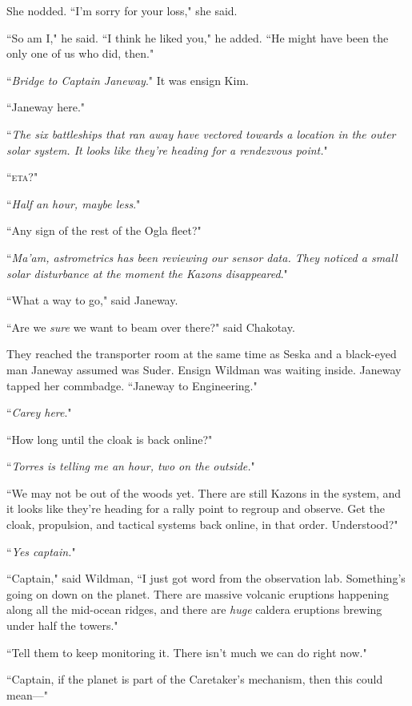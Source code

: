 \documentclass[twoside,letterpaper,12pt]{memoir}
\begin{document}
She nodded. ``I'm sorry for your loss," she said. 

``So am I," he said. ``I think he liked you," he added. ``He might have been the only one of us who did, then."

``\textit{Bridge to Captain Janeway}." It was ensign Kim. 

``Janeway here." 

``\textit{The six battleships that ran away have vectored towards a location in the outer solar system. It looks like they're heading for a rendezvous point.}" 

``\textsc{eta}?" 

``\textit{Half an hour, maybe less}." 

``Any sign of the rest of the Ogla fleet?" 

``\textit{Ma'am, astrometrics has been reviewing our sensor data. They noticed a small solar disturbance at the moment the Kazons disappeared}." 

``What a way to go," said Janeway. 

``Are we \textit{sure} we want to beam over there?" said Chakotay. 

They reached the transporter room at the same time as Seska and a black-eyed man Janeway assumed was Suder. Ensign Wildman was waiting inside. Janeway tapped her commbadge. ``Janeway to Engineering." 

``\textit{Carey here}." 

``How long until the cloak is back online?" 

``\textit{Torres is telling me an hour, two on the outside.}" 

``We may not be out of the woods yet. There are still Kazons in the system, and it looks like they're heading for a rally point to regroup and observe. Get the cloak, propulsion, and tactical systems back online, in that order. Understood?" 

``\textit{Yes captain.}" 

``Captain," said Wildman, ``I just got word from the observation lab. Something's going on down on the planet. There are massive volcanic eruptions happening along all the mid-ocean ridges, and there are \textit{huge} caldera eruptions brewing under half the towers." 

``Tell them to keep monitoring it. There isn't much we can do right now." 

``Captain, if the planet is part of the Caretaker's mechanism, then this could mean---" 
\end{document}
